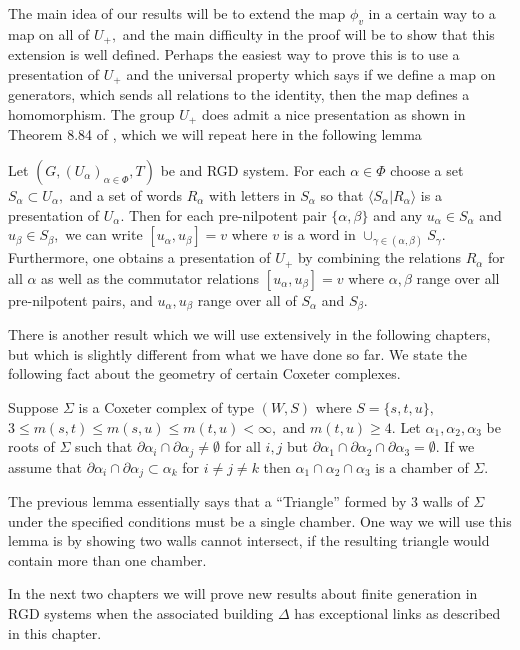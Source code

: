 \documentclass[class=book, crop=false,12 pt]{standalone}
\begin{document}
The main idea of our results will be to extend the map $\phi_v$ in a certain way to a map on all of $U_+,$ and the main difficulty in the proof will be to show that this extension is well defined. Perhaps the easiest way to prove this is to use a presentation of $U_+$ and the universal property which says if we define a map on generators, which sends all relations to the identity, then the map defines a homomorphism. The group $U_+$ does admit a nice presentation as shown in Theorem 8.84 of \cite{buildings}, which we will repeat here in the following lemma
\begin{lemma}
	\label{lem:upres}
	Let $(G,(U_\alpha)_{\alpha\in \Phi},T)$ be and RGD system. For each $\alpha\in \Phi$ choose a set $S_\alpha\subset U_\alpha,$ and a set of words $R_\alpha$ with letters in $S_\alpha$ so that $\langle S_\alpha|R_\alpha\rangle$ is a presentation of $U_\alpha.$ Then for each pre-nilpotent pair $\{\alpha,\beta\}$ and any $u_\alpha\in S_\alpha$ and $u_\beta\in S_\beta,$ we can write $[u_\alpha,u_\beta]=v$ where $v$ is a word in $\cup_{\gamma \in (\alpha,\beta)}S_\gamma.$ Furthermore, one obtains a presentation of $U_+$ by combining the relations $R_\alpha$ for all $\alpha$ as well as the commutator relations $[u_\alpha,u_\beta]=v$ where $\alpha,\beta$ range over all pre-nilpotent pairs, and $u_\alpha,u_\beta$ range over all of $S_\alpha$ and $S_\beta.$
\end{lemma}

There is another result which we will use extensively in the following chapters, but which is slightly different from what we have done so far. We state the following fact about the geometry of certain Coxeter complexes. 

\begin{lemma}
	\label{lem:tri}
	Suppose $\Sigma$ is a Coxeter complex of type $(W,S)$ where $S=\{s,t,u\},$ $3\le m(s,t)\le m(s,u)\le m(t,u)<\infty,$ and $m(t,u)\ge 4.$ Let $\alpha_1,\alpha_2,\alpha_3$ be roots of $\Sigma$ such that $\partial\alpha_i\cap \partial\alpha_j\neq \emptyset$ for all $i,j$ but $\partial\alpha_1\cap \partial\alpha_2\cap \partial \alpha_3=\emptyset.$ If we assume that $\partial\alpha_i\cap \partial\alpha_j\subset \alpha_k$ for $i\neq j\neq k$ then $\alpha_1\cap \alpha_2\cap\alpha_3$ is a chamber of $\Sigma.$
\end{lemma}

The previous lemma essentially says that a ``Triangle'' formed by 3 walls of $\Sigma$ under the specified conditions must be a single chamber. One way we will use this lemma is by showing two walls cannot intersect, if the resulting triangle would contain more than one chamber.


In the next two chapters we will prove new results about finite generation in RGD systems when the associated building $\Delta$ has exceptional links as described in this chapter.
\end{document}
